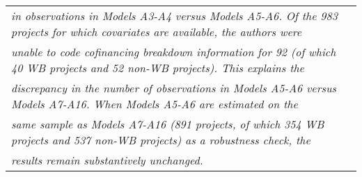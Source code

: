 \documentclass{article}
\begin{document}
\begin{singlespace}
\begin{table}[H]
{\begin{tabular}{rcccccccc}
			\multicolumn{9}{l}{\textit{in observations in Models A3-A4 versus Models A5-A6. Of the 983 projects for which covariates are available, the authors were}} \\
			\multicolumn{9}{l}{\textit{unable to code cofinancing breakdown information for 92 (of which 40 WB projects and 52 non-WB projects). This explains the}} \\
			\multicolumn{9}{l}{\textit{discrepancy in the number of observations in Models A5-A6 versus Models A7-A16. When Models A5-A6 are estimated on the}} \\
			\multicolumn{9}{l}{\textit{same sample as Models A7-A16 (891 projects, of which 354 WB projects and 537 non-WB projects) as a robustness check, the}} \\
			\multicolumn{9}{l}{\textit{results remain substantively unchanged.}}
			\end{tabular}%
		}
	\end{table}


\end{singlespace}
\end{document}
